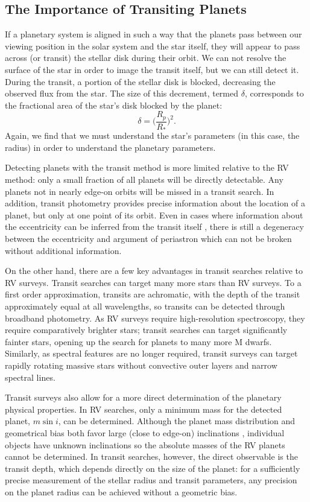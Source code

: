 \subsection{The Importance of Transiting Planets}
If a planetary system is aligned in such a way that the planets pass between our
viewing position in the solar system and the star itself, they will appear to pass
across (or transit) the stellar disk during their orbit.
We can not resolve the surface of the star in order to image the transit itself, but
we can still detect it. 
During the transit, a portion of the stellar disk is blocked, decreasing the observed
flux from the star. 
The size of this decrement, termed $\delta$, corresponds to the fractional area of the star's disk blocked by the planet:
\begin{equation}
\delta = \bigg(\frac{R_p}{R_*}\bigg)^2.
\end{equation}
Again, we find that we must understand the star's parameters (in this case, the radius)
in order to understand the planetary parameters.

Detecting planets with the transit method is more limited relative to the RV method:
only a small fraction of all planets will be directly detectable. 
Any planets not in nearly edge-on orbits will be missed in a transit search.
In addition, transit photometry provides precise information about the location 
of a planet, but only at one point of its orbit.
Even in cases where information about the eccentricity can be inferred from the
transit itself \citep{Dawson12a}, there is still a degeneracy
between the eccentricity and argument of periastron which can not be broken without
additional information.

On the other hand, there are a few key advantages in transit searches relative to 
RV surveys. 
Transit searches can target many more stars than RV surveys. 
To a first order approximation, transits are achromatic, with the depth of the transit
approximately equal at all wavelengths, so transits can be detected through broadband
photometry.
As RV surveys require high-resolution spectroscopy, they require comparatively brighter
stars; transit searches can target significantly fainter stars, opening up the search
for planets to many more M dwarfs.
Similarly, as spectral features are no longer required, transit surveys can target 
rapidly rotating massive stars without convective outer layers and narrow spectral lines.

Transit surveys also allow for a more direct determination of the planetary physical 
properties. 
In RV searches, only a minimum mass
for the detected planet, $m \sin i$, can be determined. 
Although the planet mass distribution and geometrical bias both favor large
(close to edge-on) inclinations \citep{Ho11}, individual objects have unknown inclinations
so the absolute masses of the RV planets cannot be determined.
In transit searches, however, the direct observable is the transit depth, which depends
directly on the size of the planet: for a sufficiently precise measurement of the stellar
radius and transit parameters, any precision on the planet radius can be achieved without
a geometric bias.

